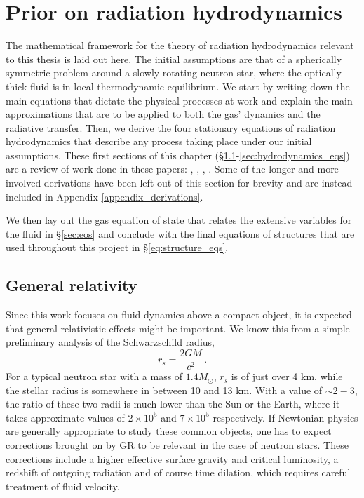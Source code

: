 \documentclass[../main.tex]{subfiles}
\begin{document}
\chapter{Prior on radiation hydrodynamics}\label{chapter2}
The mathematical framework for the theory of radiation hydrodynamics relevant to this thesis is laid out here. The initial assumptions are that of a spherically symmetric problem around a slowly rotating neutron star, where the optically thick fluid is in local thermodynamic equilibrium. We start by writing down the main equations that dictate the physical processes at work and explain the main approximations that are to be applied to both the gas' dynamics and the radiative transfer. Then, we derive the four stationary equations of radiation hydrodynamics that describe any process taking place under our initial assumptions. These first sections of this chapter (\S\ref{sec:GR}-\ref{sec:hydrodynamics_eqs}) are a review of work done in these papers: \citet{Park1993}, \citet{Park2006}, \citet{Thorne1981}, \citet{Flammang1982}. Some of the longer and more involved derivations have been left out of this section for brevity and are instead included in Appendix \ref{appendix_derivations}.

We then lay out the gas equation of state that relates the extensive variables for the fluid in \S\ref{sec:eos} and conclude with the final equations of structures that are used throughout this project in \S\ref{eq:structure_eqs}. 

\section{General relativity}\label{sec:GR}

Since this work focuses on fluid dynamics above a compact object, it is expected that general relativistic effects might be important.  We know this from a simple preliminary analysis of the Schwarzschild radius,
\begin{equation}
    r_s=\frac{2GM}{c^2}\,.
\end{equation}
For a typical neutron star with a mass of $1.4 M_\odot$, $r_s$ is of just over 4 km, while the stellar radius is somewhere in between 10 and 13 km.  With a value of $\sim 2-3$, the ratio of these two radii is much lower than the Sun or the Earth, where it takes approximate values of  $2\times 10^5$ and $7\times 10^5$ respectively.  If Newtonian physics are generally appropriate to study these common objects, one has to expect corrections brought on by GR to be relevant in the case of neutron stars.  These corrections include a higher effective surface gravity and critical luminosity, a redshift of outgoing radiation and of course time dilation, which requires careful treatment of fluid velocity. 
\end{document}
